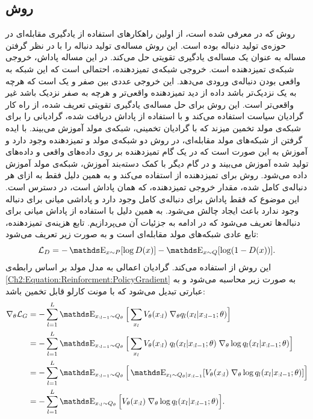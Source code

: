  \subsection{ روش }\label{Method:SeqGAN}
 روش
 که در
 \cite{SeqGAN}
 معرفی شده است، از اولین راهکار‌های استفاده از یادگیری مقابله‌ای در حوزه‌ی تولید دنباله بوده است. این روش مساله‌ی تولید دنباله را با در نظر گرفتن مساله به عنوان یک مساله‌ی یادگیری تقویتی حل می‌کند.
در این مساله پاداش، خروجی شبکه‌ی تمیزدهنده است. خروجی شبکه‌ی تمیزدهنده، احتمالی است که این شبکه به واقعی بودن دنباله‌ی ورودی می‌دهد. این خروجی عددی بین صفر و یک است که هرچه به یک نزدیک‌تر باشد داده از دید تمیزدهنده واقعی‌تر و هرچه به صفر نزدیک باشد غیر واقعی‌تر است. این روش برای حل مساله‌ی یادگیری تقویتی تعریف شده، از راه کار گرادیان سیاست استفاده می‌کند و با استفاده از پاداش دریافت شده، گرادیانی را برای شبکه‌ی مولد تخمین میزند که با گرادیان تخمینی، شبکه‌ی مولد آموزش می‌بیند.
با ایده گرفتن از شبکه‌های مولد مقابله‌ای، در روش
 دو شبکه‌ی مولد و تمیزدهنده وجود دارد و آموزش به این صورت است که در یک گام تمیزدهنده بر روی داده‌های واقعی و داده‌های تولید شده آموزش می‌بیند و در گام دیگر با کمک دسته‌بند آموزش، شبکه‌ی مولد آموزش داده می‌شود.
\newline
روش
برای تمیزدهنده از
استفاده می‌کند و به همین دلیل فقط به ازای هر دنباله‌ی کامل شده، مقدار خروجی تمیزدهنده، که همان پاداش است، در دسترس است. این موضوع که فقط پاداش برای دنباله‌ی کامل وجود دارد و پاداشی میانی برای دنباله وجود ندارد باعث ایجاد چالش می‌شود. به همین دلیل با استفاده از
پاداش میانی برای دنباله‌ها تعریف می‌شود که در ادامه به جزئیات آن می‌پردازیم.
تابع هزینه‌ی تمیزدهنده، تابع عادی شبکه‌های مولد مقابله‌ای است و به صورت زیر تعریف می‌شود:
\begin{equation}
\mathcal{L}_D = - \ME_{x \sim P} [\log D(x)] - \ME_{x \sim Q} [\log (1-D(x))].
\end{equation}
این روش از 
استفاده می‌کند. 
گرادیان اعمالی به مدل مولد بر اساس رابطه‌ی
 \ref{Ch2:Equation:Reinforcment:PolicyGradient}
به صورت زیر محاسبه می‌شود و به عبارتی تبدیل می‌شود که با مونت کارلو قابل تخمین باشد:
\begin{equation}\label{Eqauation:Method:SeqGAN:GeneratorLoss}
\begin{split}
\nabla_\theta \mathcal{L}_G &= - \sum_{l=1}^L   \ME_{x_{:l-1} \sim Q_\theta} \Big[ \sum_{x_l} V_\theta(x_{:l}) \; \nabla_\theta q_l(x_l | x_{:l-1}; \theta) \Big] \\
&= - \sum_{l=1}^L   \ME_{x_{:l-1} \sim Q_\theta} \Big[ \sum_{x_l} V_\theta(x_{:l}) \; q_l(x_l | x_{:l-1}; \theta) \; \nabla_\theta \log q_l(x_l | x_{:l-1}; \theta) \Big] \\
&= - \sum_{l=1}^L   \ME_{x_{:l-1} \sim Q_\theta} \Big[ \ME_{x_l \sim Q_\theta | x_{:l-1}} [V_\theta(x_{:l}) \; \nabla_\theta \log q_l(x_l | x_{:l-1}; \theta)] \Big] \\
&= - \sum_{l=1}^L   \ME_{x_{:l} \sim Q_\theta} \Big[ V_\theta(x_{:l}) \; \nabla_\theta \log q_l(x_l | x_{:l-1}; \theta) \Big].
\end{split}
\end{equation}
